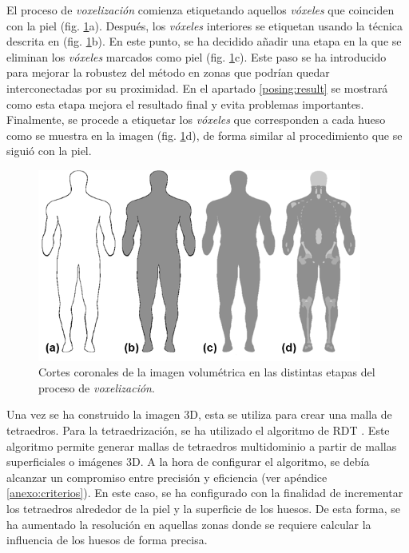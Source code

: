 El proceso de \emph{voxelización} comienza etiquetando aquellos \emph{vóxeles} que coinciden con la piel (fig. \ref{fig:voxelizacion}a). Después, los \emph{vóxeles} interiores se etiquetan usando la técnica descrita en \cite{SUZUKI20031} (fig. \ref{fig:voxelizacion}b).
En este punto, se ha decidido añadir una etapa en la que se eliminan los \emph{vóxeles} marcados como piel (fig. \ref{fig:voxelizacion}c). %
Este paso se ha introducido para mejorar la robustez del método en zonas que podrían quedar interconectadas por su proximidad. 
En el apartado \ref{posing:result} se mostrará como esta etapa mejora el resultado final y evita problemas importantes. Finalmente, se procede a etiquetar los \emph{vóxeles} que corresponden a cada hueso como se muestra en la imagen (fig. \ref{fig:voxelizacion}d), de forma similar al procedimiento que se siguió con la piel. 
%
%
\begin{figure}[th]
   \centering
    \includegraphics[width=0.95\textwidth]{IMG/Volume2.png}
    \caption{
    Cortes coronales de la imagen volumétrica en las distintas etapas del proceso de \emph{voxelización}.}
\label{fig:voxelizacion}
\end{figure}

Una vez se ha construido la imagen 3D, esta se utiliza para crear una malla de tetraedros. Para la tetraedrización, se ha utilizado el algoritmo de \ac{RDT} \cite{jamin:hal-00796052}. Este algoritmo permite generar mallas de tetraedros multidominio a partir de mallas superficiales o imágenes 3D. A la hora de configurar el algoritmo, se debía alcanzar un compromiso entre precisión y eficiencia (ver apéndice \ref{anexo:criterios}). En este caso, se ha configurado con la finalidad de incrementar los tetraedros alrededor de la piel y la superficie de los huesos. De esta forma, se ha aumentado la resolución en aquellas zonas donde se requiere calcular la influencia de los huesos de forma precisa.

